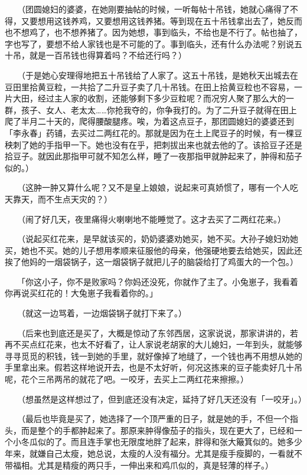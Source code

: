 \documentclass[UTF8]{ctexart}
\begin{document}
　　（团圆媳妇的婆婆，在她刚要抽帖的时候，一听每帖十吊钱，她就心痛得了不得，又要想用这钱养鸡，又要想用这钱养猪。等到现在五十吊钱拿出去了，她反而也不想鸡了，也不想养猪了。因为她想，事到临头，不给也是不行了。帖也抽了，字也写了，要想不给人家钱也是不可能的了。事到临头，还有什么办法呢？别说五十吊，就是一百吊钱也得算着吗？不给还行吗？）

　　（于是她心安理得地把五十吊钱给了人家了。这五十吊钱，是她秋天出城去在豆田里拾黄豆粒，一共拾了二升豆子卖了几十吊钱。在田上拾黄豆粒也不容易，一片大田，经过主人家的收割，还能够剩下多少豆粒呢？而况穷人聚了那么大的一群，孩子、女人、老太太……你抢我夺的，你争我打的。为了二升豆子就得在田上爬了半月二十天的，爬得腰酸腿疼。唉，为着这点豆子，那团圆媳妇的婆婆还到「李永春」药铺，去买过二两红花的。那就是因为在土上爬豆子的时候，有一棵豆秧刺了她的手指甲一下。她也没有在乎，把刺拔出来也就去他的了。该拾豆子还是拾豆子。就因此那指甲可就不知怎么样，睡了一夜那指甲就肿起来了，肿得和茄子似的。）

　　（这肿一肿又算什么呢？又不是皇上娘娘，说起来可真娇惯了，哪有一个人吃天靠天，而不生点天灾的？）

　　（闹了好几天，夜里痛得火喇喇地不能睡觉了。这才去买了二两红花来。）

　　（说起买红花来，是早就该买的，奶奶婆婆劝她买，她不买。大孙子媳妇劝她买，她也不买。她的儿子想用孝顺来征服他的母亲，他强硬地要去给她买，因此还挨了他妈的一烟袋锅子，这一烟袋锅子就把儿子的脑袋给打了鸡蛋大的一个包。）

　　「你这小子，你不是败家吗？你妈还没死，你就作了主了。小兔崽子，我看着你再说买红花的！大兔崽子我看着你的。」

　　（就这一边骂着，一边烟袋锅子就打下来了。）

　　（后来也到底还是买了，大概是惊动了东邻西居，这家说说，那家讲讲的，若再不买点红花来，也太不好看了，让人家说老胡家的大儿媳妇，一年到头，就能够寻寻觅觅的积钱，钱一到她的手里，就好像掉了地缝了，一个钱也再不用想从她的手里拿出来。假若这样地说开去，也是不太好听，何况这拣来的豆子能卖好几十吊呢，花个三吊两吊的就花了吧。一咬牙，去买上二两红花来擦擦。）

　　（想虽然是这样想过了，但到底还没有决定，延持了好几天还没有「一咬牙」。）

　　（最后也毕竟是买了，她选择了一个顶严重的日子，就是她的手，不但一个指头，而是整个的手都肿起来了。那原来肿得像茄子的指头，现在更大了，已经和一个小冬瓜似的了。而且连手掌也无限度地胖了起来，胖得和张大簸箕似的。她多少年来，就嫌自己太瘦，她总说，太瘦的人没有福分。尤其是瘦手瘦脚的，一看就不带福相。尤其是精瘦的两只手，一伸出来和鸡爪似的，真是轻薄的样子。）
\end{document}
